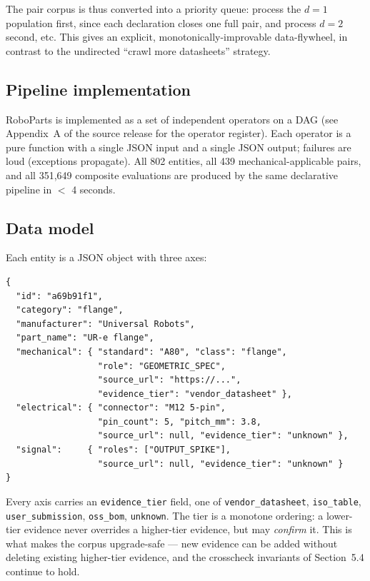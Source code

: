The pair corpus is thus converted into a priority queue: process
the $d=1$ population first, since each declaration closes one full
pair, and process $d=2$ second, etc. This gives an explicit,
monotonically-improvable data-flywheel, in contrast to the
undirected ``crawl more datasheets'' strategy.

\subsection{Pipeline implementation}

RoboParts is implemented as a set of independent operators on a
DAG (see Appendix~A of the source release for the operator
register). Each operator is a pure function with a single JSON
input and a single JSON output; failures are loud (exceptions
propagate). All 802 entities, all 439 mechanical-applicable pairs,
and all 351,649 composite evaluations are produced by the same
declarative pipeline in $<$ 4 seconds.

\subsection{Data model}

Each entity is a JSON object with three axes:

\begin{verbatim}
{
  "id": "a69b91f1",
  "category": "flange",
  "manufacturer": "Universal Robots",
  "part_name": "UR-e flange",
  "mechanical": { "standard": "A80", "class": "flange",
                  "role": "GEOMETRIC_SPEC",
                  "source_url": "https://...",
                  "evidence_tier": "vendor_datasheet" },
  "electrical": { "connector": "M12 5-pin",
                  "pin_count": 5, "pitch_mm": 3.8,
                  "source_url": null, "evidence_tier": "unknown" },
  "signal":     { "roles": ["OUTPUT_SPIKE"],
                  "source_url": null, "evidence_tier": "unknown" }
}
\end{verbatim}

Every axis carries an \texttt{evidence\_tier} field, one of
\texttt{vendor\_datasheet}, \texttt{iso\_table}, \texttt{user\_submission},
\texttt{oss\_bom}, \texttt{unknown}. The tier is a monotone ordering:
a lower-tier evidence never overrides a higher-tier evidence, but
may \emph{confirm} it. This is what makes the corpus upgrade-safe
— new evidence can be added without deleting existing higher-tier
evidence, and the crosscheck invariants of Section~5.4 continue to
hold.

